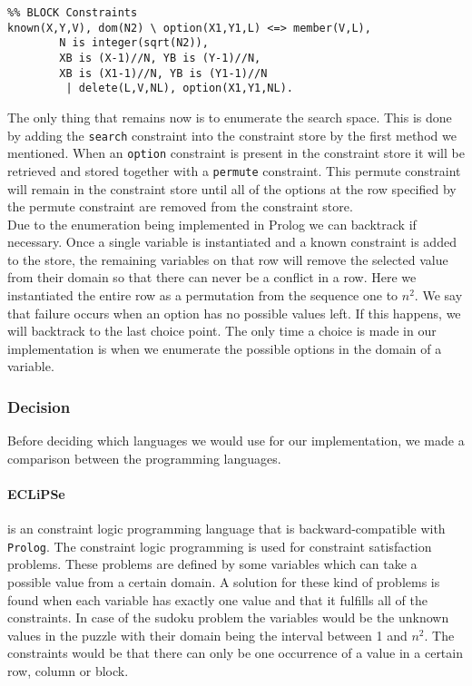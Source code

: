 \begin{lstlisting}
%% BLOCK Constraints
known(X,Y,V), dom(N2) \ option(X1,Y1,L) <=> member(V,L),
        N is integer(sqrt(N2)),
        XB is (X-1)//N, YB is (Y-1)//N,
        XB is (X1-1)//N, YB is (Y1-1)//N
         | delete(L,V,NL), option(X1,Y1,NL).
\end{lstlisting}

The only thing that remains now is to enumerate the search space. 
This is done by adding the \texttt{search} constraint into the constraint store by the first method we mentioned.
When an \texttt{option} constraint is present in the constraint store it will be retrieved and stored together with a \texttt{permute} constraint. 
This permute constraint will remain in the constraint store until all of the options at the row specified by the permute constraint are removed from the constraint store. \\

Due to the enumeration being implemented in Prolog we can backtrack if necessary.
Once a single variable is instantiated and a known constraint is added to the store, the remaining variables on that row will remove the selected value from their domain so that there can never be a conflict in a row.
Here we instantiated the entire row as a permutation from the sequence one to $n^2$. 
We say that failure occurs when an option has no possible values left.
If this happens, we will backtrack to the last choice point. 
The only time a choice is made in our implementation is when we enumerate the possible options in the domain of a variable.

\subsubsection{Decision}
Before deciding which languages we would use for our implementation, we made a comparison between the programming languages.

\paragraph*{ECLiPSe} is an constraint logic programming language that is backward-compatible with \texttt{Prolog}.
The constraint logic programming is used for constraint satisfaction problems.
These problems are defined by some variables which can take a possible value from a certain domain.
A solution for these kind of problems is found when each variable has exactly one value and that it fulfills all of the constraints.
In case of the sudoku problem the variables would be the unknown values in the puzzle with their domain being the interval between 1 and $n^2$.
The constraints would be that there can only be one occurrence of a value in a certain row, column or block.

